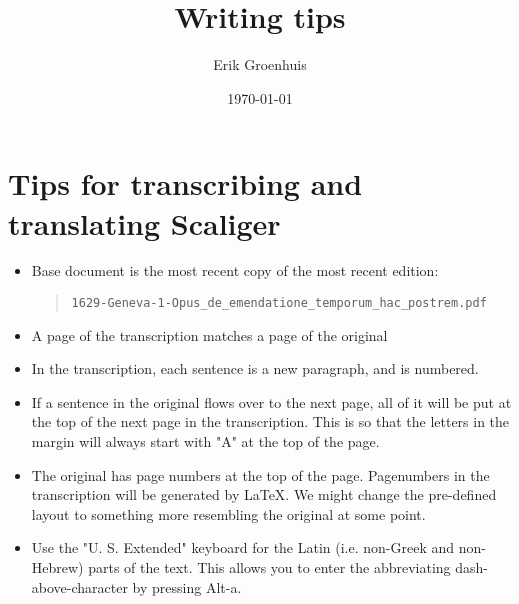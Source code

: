 \documentclass{report}
\title{Writing tips}
\author{Erik Groenhuis}
\date{\today}              %
\begin{document}
\maketitle

\tableofcontents{}




\chapter{Tips for transcribing and translating Scaliger}

\begin{itemize}
\item Base document is the most recent copy of the most recent edition:
\begin{quote}
  \verb+1629-Geneva-1-Opus_de_emendatione_temporum_hac_postrem.pdf+
\end{quote}
\item A page of the transcription matches a page of the original
\item In the transcription, each sentence is a new paragraph, and is numbered.
\item If a sentence in the original flows over to the next page, all of it will be put at the top of the next page in the transcription.  This is so that the letters in the margin will always start with "A" at the top of the page.
\item The original has page numbers at the top of the page. Pagenumbers in the transcription will be generated by LaTeX. We might change the pre-defined layout to something more resembling the original at some point.
\item Use the "U. S. Extended" keyboard for the Latin (i.e. non-Greek and non-Hebrew) parts of the text. This allows you to enter the abbreviating dash-above-character by pressing Alt-a.
\end{itemize}
\end{document}
